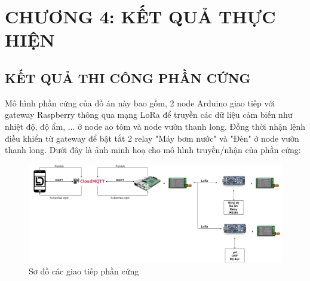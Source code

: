 \section*{CHƯƠNG 4: KẾT QUẢ THỰC HIỆN}
\setcounter{section}{4}
\setcounter{figure}{0}
\setcounter{subsection}{0}
\subsection{KẾT QUẢ THI CÔNG PHẦN CỨNG}
Mô hình phần cứng của đồ án này bao gồm, 2 node Arduino giao tiếp với gateway Raspberry thông qua mạng LoRa để truyền các dữ liệu cảm biến như nhiệt độ, độ ẩm, ... ở node ao tôm và node vườn thanh long. Đồng thời nhận lệnh điều khiển từ gateway để bật tắt 2 relay "Máy bơm nước" và "Đèn" ở node vườn thanh long. Dưới đây là ảnh minh hoạ cho mô hình truyền/nhận của phần cứng:
\begin{figure}[H]
	\centering
	\includegraphics[scale=0.2]{Chapter 4/image chapter 4/sodoDCLV.png}
	\caption[Sơ đồ các giao tiếp phần cứng]{Sơ đồ các giao tiếp phần cứng}
	\label{hinh41}
\end{figure}
